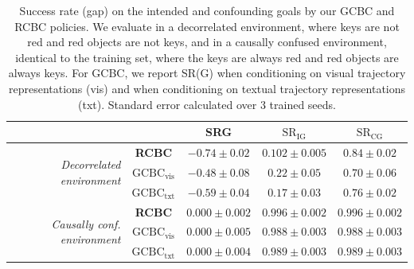 \documentclass[../main.tex]{subfiles}
\begin{document}
\begin{table}[tb]
	\centering
	\caption[Success rate on the intended and confounding goals]{Success rate (gap) on the intended
		and confounding goals by our GCBC and RCBC policies. We evaluate in a decorrelated environment,
		where keys are not red and red objects are not keys, and in a causally confused environment,
		identical to the training set, where the keys are always red and red objects are always keys.
		For GCBC, we report SR(G) when conditioning on visual trajectory representations (vis) and when
		conditioning on textual trajectory representations (txt). Standard error calculated over
		3 trained seeds.}
	\label{tab:gmg-results}
	\begin{tabular}{@{}rcccc@{}}
		\toprule
		              &                                   & \textbf{SRG}      & \textbf{$\text{SR}_\text{IG}$} & \textbf{$\text{SR}_\text{CG}$} \\ \midrule
		\multirow{3}{2.5cm}{\textit{Decorrelated environment}}
		              &
		\textbf{RCBC} & $-0.74 \pm 0.02$                  & $0.102 \pm 0.005$ & $0.84 \pm 0.02$                                                 \\
		              & \textbf{$\text{GCBC}_\text{vis}$} & $-0.48 \pm 0.08$  & $0.22 \pm 0.05$                & $0.70 \pm 0.06$                \\
		              & \textbf{$\text{GCBC}_\text{txt}$} & $-0.59 \pm 0.04$  & $0.17 \pm 0.03$                & $0.76 \pm 0.02$                \\
		\midrule
		\multirow{3}{2.5cm}{\textit{Causally conf. environment}}
		              &
		\textbf{RCBC} & $0.000 \pm 0.002$                 & $0.996 \pm 0.002$ & $0.996 \pm 0.002$                                               \\
		              & \textbf{$\text{GCBC}_\text{vis}$} & $0.000 \pm 0.005$ & $0.988 \pm 0.003$              & $0.988 \pm 0.003$              \\
		              & \textbf{$\text{GCBC}_\text{txt}$} & $0.000 \pm 0.004$ & $0.989 \pm 0.003$              & $0.989 \pm 0.003$              \\ \bottomrule
	\end{tabular}
\end{table}
\end{document}
